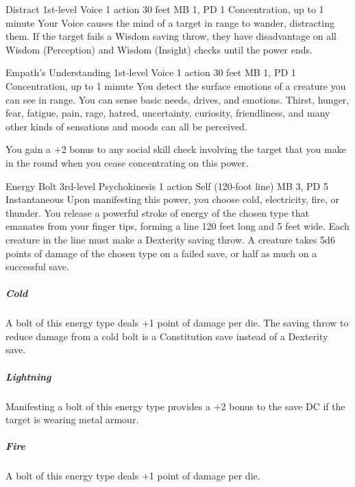 \DndPowerHeader%
  {Distract}
  {1st-level Voice}
  {1 action}
  {30 feet}
  {MB 1, PD 1}
  {Concentration, up to 1 minute}
Your Voice causes the mind of a target in range to wander,
distracting them.
If the target fails a Wisdom saving throw,
they have disadvantage on all Wisdom (Perception)
and Wisdom (Insight) checks until the power ends.

\DndPowerHeader%
  {Empath's Understanding}
  {1st-level Voice}
  {1 action}
  {30 feet}
  {MB 1, PD 1}
  {Concentration, up to 1 minute}
You detect the surface emotions of a creature you can see in range.
You can sense basic needs, drives, and emotions.
Thirst, hunger, fear, fatigue, pain, rage, hatred, uncertainty,
curiosity, friendliness, and many other kinds of sensations and moods
can all be perceived.

You gain a +2 bonus to any social skill check involving the target
that you make in the round when you cease concentrating on this power.

\DndPowerHeader%
  {Energy Bolt}
  {3rd-level Psychokinesis}
  {1 action}
  {Self (120-foot line)}
  {MB 3, PD 5}
  {Instantaneous}
  Upon manifesting this power, you choose cold, electricity,
  fire, or thunder.
  You release a powerful stroke of energy of the chosen type
  that emanates from your finger tips,
  forming a line 120 feet long and 5 feet wide.
  Each creature in the line must make a Dexterity saving throw.
  A creature takes 5d6 points of damage of the chosen type
  on a failed save,
  or half as much on a successful save.
  
  \subparagraph{Cold}
  A bolt of this energy type deals +1 point of damage per die.
  The saving throw to reduce damage from a cold bolt
  is a Constitution save instead of a Dexterity save.
  
  \subparagraph{Lightning}
  Manifesting a bolt of this energy type provides
  a +2 bonus to the save DC if the target is wearing metal armour.
  
  \subparagraph{Fire}
  A bolt of this energy type deals +1 point of damage per die.
  
